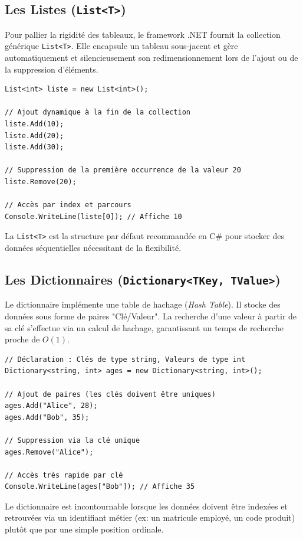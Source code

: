 \subsection{Les Listes (\texttt{List<T>})}
Pour pallier la rigidité des tableaux, le framework .NET fournit la collection générique \texttt{List<T>}. Elle encapsule un tableau sous-jacent et gère automatiquement et silencieusement son redimensionnement lors de l'ajout ou de la suppression d'éléments.

\begin{lstlisting}[style=csharpstyle]
List<int> liste = new List<int>();

// Ajout dynamique à la fin de la collection
liste.Add(10);
liste.Add(20);
liste.Add(30);

// Suppression de la première occurrence de la valeur 20
liste.Remove(20);

// Accès par index et parcours
Console.WriteLine(liste[0]); // Affiche 10
\end{lstlisting}

La \texttt{List<T>} est la structure par défaut recommandée en C\# pour stocker des données séquentielles nécessitant de la flexibilité.

\subsection{Les Dictionnaires (\texttt{Dictionary<TKey, TValue>})}
Le dictionnaire implémente une table de hachage (\textit{Hash Table}). Il stocke des données sous forme de paires "Clé/Valeur". La recherche d'une valeur à partir de sa clé s'effectue via un calcul de hachage, garantissant un temps de recherche proche de $O(1)$.

\begin{lstlisting}[style=csharpstyle]
// Déclaration : Clés de type string, Valeurs de type int
Dictionary<string, int> ages = new Dictionary<string, int>();

// Ajout de paires (les clés doivent être uniques)
ages.Add("Alice", 28);
ages.Add("Bob", 35);

// Suppression via la clé unique
ages.Remove("Alice");

// Accès très rapide par clé
Console.WriteLine(ages["Bob"]); // Affiche 35
\end{lstlisting}

Le dictionnaire est incontournable lorsque les données doivent être indexées et retrouvées via un identifiant métier (ex: un matricule employé, un code produit) plutôt que par une simple position ordinale.

